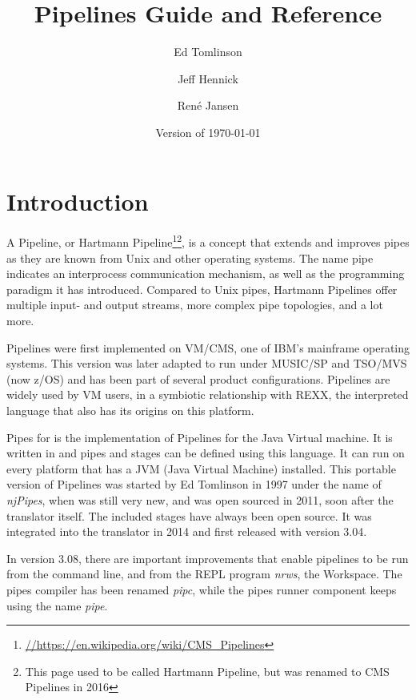 

\renewcommand{\isbn}{978-90-819090-3-7}    
\setcounter{tocdepth}{1} 
\title{Pipelines Guide and Reference}
\author{Ed Tomlinson \and Jeff Hennick \and René Jansen}
\date{\null\hfill Version  of \today}
\maketitle
{}
\pagestyle{plain}
\frontmatter
{}
\pagestyle{plain}

\tableofcontents
\newpage
{}
\frontmatter
\large


\mainmatter
\chapter{Introduction}
A Pipeline, or Hartmann
Pipeline\footnote{\url{//https://en.wikipedia.org/wiki/CMS_Pipelines}}\footnote{This
  page used to be called Hartmann Pipeline, but was renamed to CMS Pipelines
  in 2016}, is a concept that extends and improves pipes as they are known from Unix and other operating systems. The name pipe indicates an interprocess communication mechanism, as well as the programming paradigm it has introduced. Compared to Unix pipes, Hartmann Pipelines offer multiple input- and output streams, more complex pipe topologies, and a lot more.

Pipelines were first implemented on VM/CMS, one of IBM's mainframe
operating systems. This version was later adapted to run under
MUSIC/SP and TSO/MVS (now z/OS) and has been part of several product configurations. Pipelines are
widely used by VM users, in a symbiotic relationship with REXX, the
interpreted language that also has its origins on this platform.

Pipes for \nr{} is the implementation of Pipelines for the Java Virtual
machine. It is written in \nr{} and pipes and stages can be defined using this
language. It can run on every platform that has a JVM
(Java Virtual Machine) installed. This portable version of Pipelines was started
by Ed Tomlinson in 1997 under the name of \emph{njPipes}, when \nr{} was
still very new, and was open sourced in 2011, soon after the \nr{}
translator itself. The included stages have always been open source. It was integrated into the \nr{} translator in
2014 and first released with version 3.04.

In version 3.08, there are
important improvements that enable pipelines to be run from the
command line, and from the \nr{} REPL program \emph{nrws}, the
\nr{} Workspace. The pipes compiler has been renamed
\emph{pipc}, while the pipes runner component keeps using the name \emph{pipe}.

